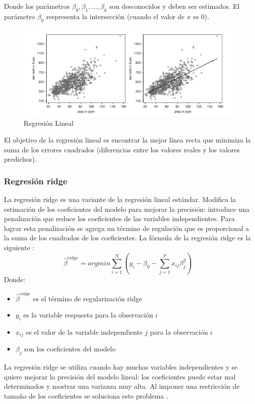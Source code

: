 \documentclass[12pt,a4paper,Spanish]{article}
\begin{document}
Donde los parámetros $\beta_0, \beta_1, ..., \beta_k$ son desconocidos y deben ser estimados. El parámetro $\beta_0$ respresenta la intersección (cuando el valor de $x$ es 0).
\newline
\begin{figure}[H]
	\centering
	\includegraphics[width=0.7\linewidth]{figs/linear_regression}
	\caption{Regresión Lineal}
	\label{fig:linearregression}
\end{figure}
El objetivo de la regresión lineal es encontrar la mejor línea recta que minimiza la suma de los errores cuadrados (diferencias entre los valores reales y los valores predichos).

\subsubsection{Regresión ridge}
La regresión ridge es una variante de la regresión lineal estándar. Modifica la estimación de los coeficientes del modelo para mejorar la precisión: introduce una penalización que reduce los coeficientes de las variables independientes. Para lograr esta penalización se agrega un término de regulación que es proporcional a la suma de los cuadrados de los coeficientes. La fórmula de la regresión ridge es la siguiente \cite{hastie2009elements}:
\begin{equation}
	\hat{\beta}^{ridge} = argmin {\sum_{i=1}^{N}} (y_i - \beta_0 - \sum_{j=1}^{p}x_{ij}\beta^{2}_j)
\end{equation}
\newline
Donde:
\begin{itemize}
	\item $\hat{\beta}^{ridge}$ es el término de regularización ridge
	\item $y_i$ es la variable respuesta para la observación $i$
	\item $x_{ij}$ es el valor de la variable independiente $j$ para la observación $i$
	\item $\beta_{j}$ son los coeficientes del modelo
\end{itemize}
La regresión ridge se utiliza cuando hay muchas variables independientes y se quiere mejorar la precisión del modelo lineal: los coeficientes puede estar mal determinados y mostrar una varianza muy alta. Al imponer una restricción de tamaño de los coeficientes se soluciona este problema \cite{fahrmeir2013regression}.
\end{document}

